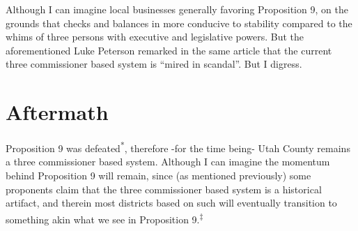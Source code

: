 Although I can imagine local businesses generally favoring Proposition 9, on the grounds that checks and balances in more conducive to stability compared to the whims of three persons with executive and legislative powers. But the aforementioned Luke Peterson remarked in the same article that the current three commissioner based system is ``mired in scandal''. But I digress. 


\section{Aftermath}

Proposition 9 was defeated\textsuperscript{*}, therefore -for the time being- Utah County remains a three commissioner based system. Although I can imagine the momentum behind Proposition 9 will remain, since (as mentioned previously) some proponents claim that the three commissioner based system is a historical artifact, and therein most districts based on such will eventually transition to something akin what we see in Proposition 9.\textsuperscript{‡}
